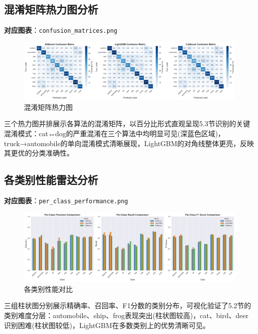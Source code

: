 \documentclass[UTF8]{report}
\theoremstyle{MyLineTheoremStyle} %
\theoremstyle{MyBlockTheoremStyle} %
\theoremstyle{MySubsubsectionStyle} %
\begin{document}
\subsection{混淆矩阵热力图分析}
\textbf{对应图表}：\texttt{confusion\_matrices.png}
\begin{figure}[H]
    \centering
    \includegraphics[width=\textwidth]{confusion_matrices.png}
    \caption{混淆矩阵热力图}
\end{figure}
三个热力图并排展示各算法的混淆矩阵，以百分比形式直观呈现5.3节识别的关键混淆模式：cat↔dog的严重混淆在三个算法中均明显可见(深蓝色区域)，truck→automobile的单向混淆模式清晰展现，LightGBM的对角线整体更亮，反映其更优的分类准确性。

\subsection{各类别性能雷达分析}
\textbf{对应图表}：\texttt{per\_class\_performance.png}
\begin{figure}[H]
    \centering
    \includegraphics[width=\textwidth]{per_class_performance.png}
    \caption{各类别性能对比}
\end{figure}
三组柱状图分别展示精确率、召回率、F1分数的类别分布，可视化验证了5.2节的类别难度分层：automobile、ship、frog表现突出(柱状图较高)，cat、bird、deer识别困难(柱状图较低)，LightGBM在多数类别上的优势清晰可见。
\end{document}
